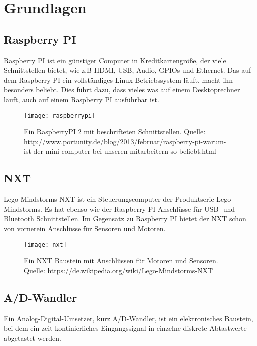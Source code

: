 \chapter{Grundlagen}
\section{Raspberry PI}
\label{Grundlagen:RaspberryPI}

Raspberry PI ist ein günstiger Computer in Kreditkartengröße, der viele Schnittstellen bietet, wie z.B HDMI, USB, Audio, GPIOs und Ethernet.
Das auf dem Raspberry PI ein vollständiges Linux Betriebssystem läuft, macht ihn besonders beliebt. Dies führt dazu, dass vieles was auf einem Desktoprechner läuft, auch auf einem Raspberry PI ausführbar ist.

\begin{figure}[h]
  \centering
  \texttt{[image: raspberrypi]}
  \caption{Ein RaspberryPI 2 mit beschrifteten Schnittstellen. Quelle: http://www.portunity.de/blog/2013/februar/raspberry-pi-warum-ist-der-mini-computer-bei-unseren-mitarbeitern-so-beliebt.html}
  \label{Kap1:RaspberryPI}
\end{figure}

\section{NXT}
\label{Grundlagen:NXT}

Lego Mindstorms NXT ist ein Steuerungscomputer der Produktserie Lego Mindstorms. Es hat ebenso wie der Raspberry PI Anschlüsse für USB- und Bluetooth Schnittstellen. Im Gegensatz zu Raspberry PI bietet der NXT schon von vornerein Anschlüsse für Sensoren und Motoren. 

\begin{figure}[h]
  \centering
  \texttt{[image: nxt]}
  \caption{Ein NXT Baustein mit Anschlüssen für Motoren und Sensoren. Quelle: https://de.wikipedia.org/wiki/Lego-Mindstorms-NXT}
  \label{Kap1:NXT}
\end{figure}

\section{A/D-Wandler}

Ein Analog-Digital-Umsetzer, kurz A/D-Wandler, ist ein elektronisches Baustein, bei dem ein zeit-kontinierliches Eingangssignal in einzelne diskrete Abtastwerte abgetastet werden.

